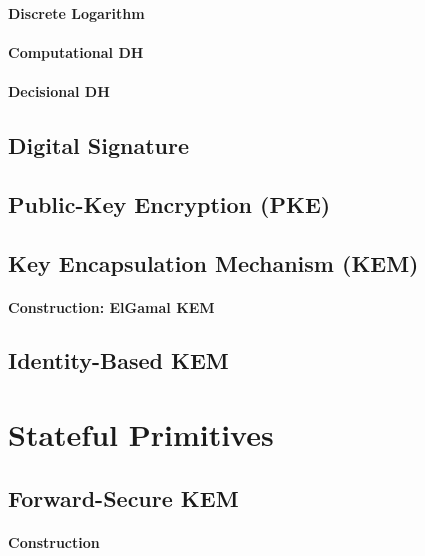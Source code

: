 \documentclass[a4paper,orivec]{llncs}
\begin{document}
\paragraph{Discrete Logarithm}

\paragraph{Computational DH}

\paragraph{Decisional DH}


\subsection{Digital Signature}


\subsection{Public-Key Encryption (PKE)}


\subsection{Key Encapsulation Mechanism (KEM)}

\paragraph{Construction: ElGamal KEM}


\subsection{Identity-Based KEM}



\section{Stateful Primitives}

\subsection{Forward-Secure KEM}

\paragraph{Construction}
\end{document}
